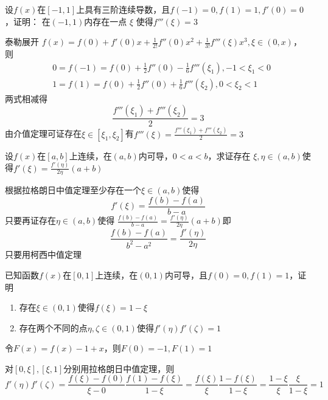 \documentclass{article}
\begin{document}
\begin{examplle}[]
设\(f(x)\)在\([-1,1]\)上具有三阶连续导数，且\(f(-1)=0,f(1)=1,f'(0)=0\)，证明：
在\((-1,1)\)内存在一点 \(\xi\) 使得\(f'''(\xi)=3\)

泰勒展开
\(f(x)=f(0)+f'(0)x+\frac{1}{2!}f''(0)x^2+\frac{1}{3!}f'''(\xi)x^3,\xi\in(0,x)\)，
则
\begin{align*}
&0=f(-1)=f(0)+\frac{1}{2}f''(0)-\frac{1}{6}f'''(\xi_1),-1<\xi_1<0\\
&1=f(1)=f(0)+\frac{1}{2}f''(0)+\frac{1}{6}f'''(\xi_2),0<\xi_2<1
\end{align*}
两式相减得
\begin{equation*}
\frac{f'''(\xi_1)+f'''(\xi_2)}{2}=3
\end{equation*}
由介值定理可证存在\(\xi\in[\xi_1,\xi_2]\)有\(f'''(\xi)=\frac{f'''(\xi_1)+f'''(\xi_2)}{2}=3\)
\end{examplle}

\begin{examplle}[]
设\(f(x)\)在\([a,b]\)上连续，在\((a,b)\)内可导，\(0<a<b\)，求证存在
\(\xi,\eta\in(a,b)\)使得\(f'(\xi)=\frac{f'(\eta)}{2\eta}(a+b)\)

根据拉格朗日中值定理至少存在一个\(\xi\in(a,b)\)使得
\begin{equation*}
f'(\xi)=\frac{f(b)-f(a)}{b-a}
\end{equation*}
只要再证存在\(\eta\in(a,b)\)使得
\(\frac{f(b)-f(a)}{b-a}=\frac{f'(\eta)}{2\eta}(a+b)\)即
\begin{equation*}
\frac{f(b)-f(a)}{b^2-a^2}=\frac{f'(\eta)}{2\eta}
\end{equation*}
只要用柯西中值定理
\end{examplle}

\begin{examplle}[]
已知函数\(f(x)\)在\([0,1]\)上连续，在\((0,1)\)内可导，且\(f(0)=0,f(1)=1\)，证
明
\begin{enumerate}
\item 存在\(\xi\in(0,1)\)使得\(f(\xi)=1-\xi\)
\item 存在两个不同的点\(\eta,\zeta\in(0,1)\)使得\(f'(\eta)f'(\zeta)=1\)
\end{enumerate}


令\(F(x)=f(x)-1+x\)，则\(F(0)=-1,F(1)=1\)

对\([0,\xi],[\xi,1]\)分别用拉格朗日中值定理，则
\begin{equation*}
f'(\eta)f'(\zeta)=\frac{f(\xi)-f(0)}{\xi-0}\frac{f(1)-f(\xi)}{1-\xi}=
\frac{f(\xi)}{\xi}\frac{1-f(\xi)}{1-\xi}=
\frac{1-\xi}{\xi}\frac{\xi}{1-\xi}=1
\end{equation*}
\end{examplle}
\end{document}
